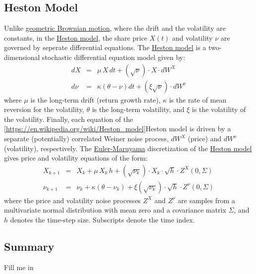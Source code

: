 \documentclass[11pt]{article}
\theoremstyle{definition}
\begin{document}
\subsection{Heston Model}
Unlike \href{https://en.wikipedia.org/wiki/Geometric_Brownian_motion}{geometric Brownian motion}, where the drift and the volatility are constants, 
in the \href{https://en.wikipedia.org/wiki/Heston_model}{Heston model}, the share price $X(t)$ and volatility $\nu$ are governed by 
seperate differential equations. The \href{https://en.wikipedia.org/wiki/Heston_model}{Heston model} is a two-dimensional stochastic differential equation model given by:
\begin{eqnarray*}
dX & = & \mu\,{X}\,{dt} + \left(\sqrt{\nu}\right)\cdot{X}\cdot{dW}^{X} \\
d\nu & = & \kappa\left(\theta - \nu\right)dt +\left(\xi\sqrt{\nu}\right)\cdot{dW^{\nu}}
\end{eqnarray*}
where $\mu$ is the long-term drift (return growth rate), $\kappa$ is the rate of mean reversion for the volatility,
$\theta$ is the long-term volatility, and $\xi$ is the volatility of the volatility.
Finally, each equation of the \ref{https://en.wikipedia.org/wiki/Heston_model}{Heston model} 
is driven by a separate (potentially) correlated Weiner noise process, $dW^{X}$ (price) and $dW^{\nu}$ (volatility), respectively. 
The \href{https://en.wikipedia.org/wiki/Euler%E2%80%93Maruyama_method}{Euler-Maruyama} discretization of the 
\href{https://en.wikipedia.org/wiki/Heston_model}{Heston model} gives price and volatility equations of the form:
\begin{eqnarray*}
X_{k+1} & = & X_{k} + \mu\,{X_{k}}\,h + \left(\sqrt{\nu_{k}}\right)\cdot{X}_{k}\cdot\sqrt{h}\cdot{Z}^{X}(0,\Sigma)\\
\nu_{k+1} & = & \nu_{k} + \kappa\left(\theta - \nu_{k}\right) + \xi\left(\sqrt{\nu_{k}}\right)\cdot\sqrt{h}\cdot{Z}^{\nu}(0,\Sigma)
\end{eqnarray*}
where the price and volatility noise processes $Z^{X}$ and $Z^{\nu}$ are samples 
from a multivariate normal distribution with mean zero and a covariance matrix $\Sigma$, 
and $h$ denotes the time-step size. Subscripts denote the time index.

\subsection{Summary}
Fill me in
\end{document}
